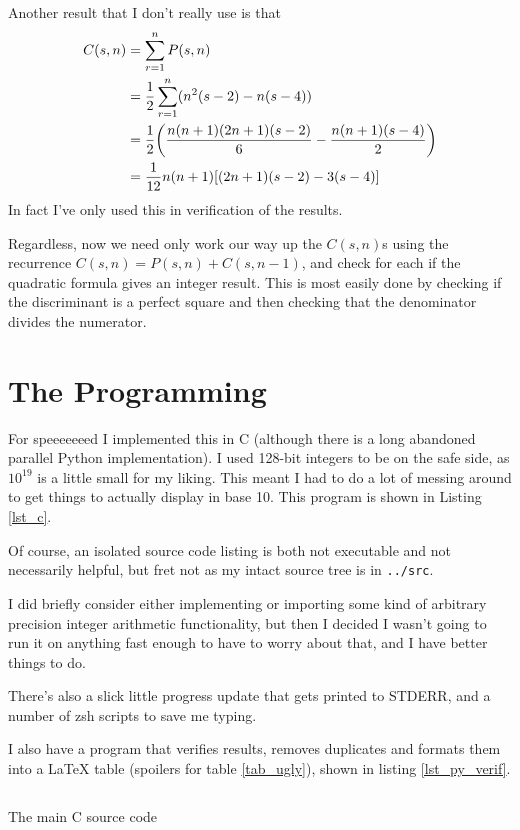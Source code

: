 Another result that I don't really use is that
\begin{align*}
C(s, n) &= \sum_{r = 1}^n P(s, n) \\
    &= \frac 12 \sum_{r = 1}^n (n^2(s - 2) - n(s - 4)) \\
    &= \frac 12 \pqty{\frac{n(n + 1)(2n + 1)(s - 2)} 6
                    - \frac{n(n + 1)(s - 4)} 2} \\
    &= \frac 1{12}n(n + 1)\bqty{(2n + 1)(s - 2) - 3(s - 4)}
\end{align*}
In fact I've only used this in verification of the results.

Regardless, now we need only work our way up the \(C(s, n)\)s using the
recurrence \(C(s, n) = P(s, n) + C(s, n - 1)\), and check for each if the
quadratic formula gives an integer result. This is most easily done by checking
if the discriminant is a perfect square and then checking that the denominator
divides the numerator.

\section{The Programming}

For speeeeeeed I implemented this in C (although there is a long abandoned
parallel Python implementation). I used 128-bit integers to be on the safe side,
as \(10^{19}\) is a little small for my liking. This meant I had to do a lot of
messing around to get things to actually display in base 10. This program is
shown in Listing \ref{lst_c}.

Of course, an isolated source code listing is both not executable and not
necessarily helpful, but fret not as my intact source tree is in
\texttt{../src}.

I did briefly consider either implementing or importing some kind of arbitrary
precision integer arithmetic functionality, but then I decided I wasn't going to
run it on anything fast enough to have to worry about that, and I have better
things to do.

There's also a slick little progress update that gets printed to STDERR, and a
number of zsh scripts to save me typing.

I also have a program that verifies results, removes duplicates and formats them
into a \LaTeX{} table (spoilers for table \ref{tab_ugly}), shown in listing
\ref{lst_py_verif}.

\begin{longlisting}
\inputminted{c}{../src/c/cannonball.c}
\caption{The main C source code}
\label{lst_c}
\end{longlisting}

